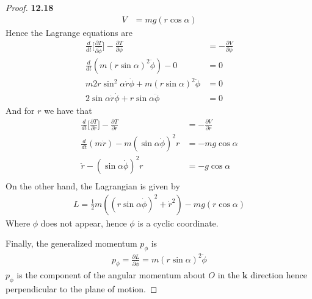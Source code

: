 \documentclass[11pt]{article}
\theoremstyle{definition}
\begin{document}
\begin{proof}{\textbf{12.18}}
\begin{align*}
        V &= mg(r\cos\alpha)
    \end{align*}
    Hence the Lagrange equations are
    \begin{align*}
        \frac{d}{dt}\bigg[\frac{\partial T}{\partial \dot{\phi}}\bigg] - 
        \frac{\partial T}{\partial \phi}
        &= -\frac{\partial V}{\partial \phi}\\
        \frac{d}{dt}(m(r\sin\alpha)^2\dot{\phi}) - 0 &= 0\\
        m2r\sin^2\alpha\dot{r}\dot{\phi} + m(r\sin\alpha)^2\ddot{\phi} &= 0\\
        2\sin\alpha\dot{r}\dot{\phi} + r\sin\alpha\ddot{\phi} &= 0
    \end{align*}
    And for $r$ we have that
    \begin{align*}
        \frac{d}{dt}\bigg[\frac{\partial T}{\partial \dot{r}}\bigg] - 
        \frac{\partial T}{\partial r}
        &= -\frac{\partial V}{\partial r}\\
        \frac{d}{dt}(m\dot{r}) - m(\sin\alpha\dot{\phi})^2r &= -mg\cos\alpha \\
        \ddot{r} - (\sin\alpha\dot{\phi})^2r &= -g\cos\alpha \\
    \end{align*}
    On the other hand, the Lagrangian is given by
    \begin{align*}
        L = \frac{1}{2}m((r\sin\alpha\dot{\phi})^2 + \dot{r}^2) - mg(r\cos\alpha)
    \end{align*}
    Where $\phi$ does not appear, hence $\phi$ is a cyclic coordinate.

    Finally, the generalized momentum $p_\phi$ is
    \begin{align*}
        p_\phi = \frac{\partial L}{\partial \dot\phi} = m(r\sin\alpha)^2\dot\phi
    \end{align*}
    $p_\phi$ is the component of the angular momentum about $O$ in the $\bm{k}$
    direction hence perpendicular to the plane of motion.
\end{proof}
\cleardoublepage
\end{document}
